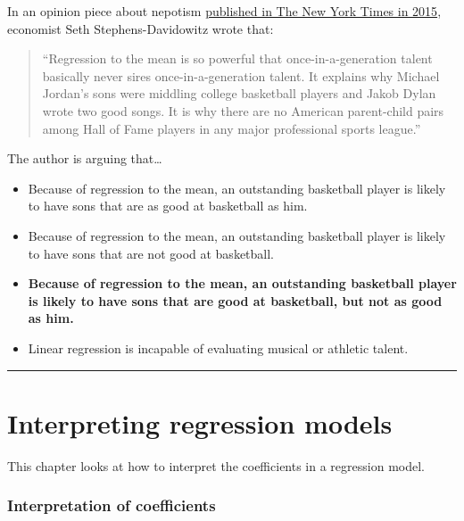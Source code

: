 \documentclass[
]{book}
\begin{document}
In an opinion piece about nepotism \href{https://www.nytimes.com/2015/03/22/opinion/sunday/seth-stephens-davidowitz-just-how-nepotistic-are-we.html}{published in The New York Times in 2015}, economist Seth Stephens-Davidowitz wrote that:

\begin{quote}
``Regression to the mean is so powerful that once-in-a-generation talent basically never sires once-in-a-generation talent. It explains why Michael Jordan's sons were middling college basketball players and Jakob Dylan wrote two good songs. It is why there are no American parent-child pairs among Hall of Fame players in any major professional sports league.''
\end{quote}

The author is arguing that\ldots{}

\begin{itemize}
\item
  Because of regression to the mean, an outstanding basketball player is likely to have sons that are as good at basketball as him.
\item
  Because of regression to the mean, an outstanding basketball player is likely to have sons that are not good at basketball.
\item
  \textbf{Because of regression to the mean, an outstanding basketball player is likely to have sons that are good at basketball, but not as good as him.}
\item
  Linear regression is incapable of evaluating musical or athletic talent.
\end{itemize}

\begin{center}\rule{0.5\linewidth}{0.5pt}\end{center}

\hypertarget{interpreting-regression-models}{%
\chapter{Interpreting regression models}\label{interpreting-regression-models}}

This chapter looks at how to interpret the coefficients in a regression model.

\hypertarget{interpretation-of-coefficients}{%
\subsection*{Interpretation of coefficients}\label{interpretation-of-coefficients}}
\end{document}
